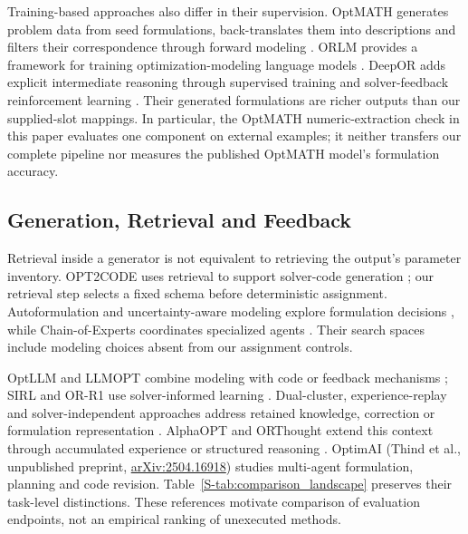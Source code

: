 \documentclass[pdflatex,iicol,sn-basic,Numbered]{sn-jnl}
\begin{document}
Training-based approaches also differ in their supervision. OptMATH generates problem data from seed formulations, back-translates them into descriptions and filters their correspondence through forward modeling \cite{lu2025optmath}. ORLM provides a framework for training optimization-modeling language models \cite{huang2025orlm}. DeepOR adds explicit intermediate reasoning through supervised training and solver-feedback reinforcement learning \cite{xiao2026deepor}. Their generated formulations are richer outputs than our supplied-slot mappings. In particular, the OptMATH numeric-extraction check in this paper evaluates one component on external examples; it neither transfers our complete pipeline nor measures the published OptMATH model's formulation accuracy.

\subsection{Generation, Retrieval and Feedback}
\label{subsec:rw_retrieval_memory}
Retrieval inside a generator is not equivalent to retrieving the output's parameter inventory. OPT2CODE uses retrieval to support solver-code generation \cite{ahmed2025opt2code}; our retrieval step selects a fixed schema before deterministic assignment. Autoformulation and uncertainty-aware modeling explore formulation decisions \cite{astorga2025autoformulation,yu2026uncertainty}, while Chain-of-Experts coordinates specialized agents \cite{xiao2024chainofexperts}. Their search spaces include modeling choices absent from our assignment controls.

OptLLM and LLMOPT combine modeling with code or feedback mechanisms \cite{zhang2024optllm,jiang2025llmopt}; SIRL and OR-R1 use solver-informed learning \cite{chen2025solver,ding2026orr1}. Dual-cluster, experience-replay and solver-independent approaches address retained knowledge, correction or formulation representation \cite{zhang2026dual,xie2026escaping,li2026solver}. AlphaOPT and ORThought extend this context through accumulated experience or structured reasoning \cite{kong2025alphaopt,yang2026orthought}. OptimAI (Thind et al., unpublished preprint, \href{https://arxiv.org/abs/2504.16918}{arXiv:2504.16918}) studies multi-agent formulation, planning and code revision. Table~\ref{S-tab:comparison_landscape} preserves their task-level distinctions. These references motivate comparison of evaluation endpoints, not an empirical ranking of unexecuted methods.
\end{document}
